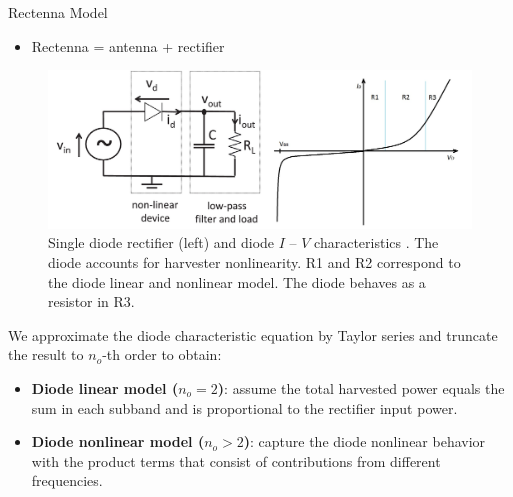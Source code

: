\documentclass[xcolor={table}]{beamer}
\begin{document}
\begin{frame}[fragile=singleslide,t]
\begin{columns}[onlytextwidth,T]
\begin{column}{.47\textwidth}
\begin{block}{Rectenna Model}
\begin{itemize}
  \item Rectenna = antenna + rectifier
\end{itemize}
\begin{figure}
  \centering
    \includegraphics[width=\textwidth]{rectenna_model}
  \caption{Single diode rectifier (left) and diode $I$ -- $V$ characteristics \citep{Clerckx2019}. The diode accounts for harvester nonlinearity. R1 and R2 correspond to the diode linear and nonlinear model. The diode behaves as a resistor in R3.}
  \label{fig:rectenna_model}
\end{figure}
We approximate the diode characteristic equation by Taylor series and truncate the result to ${n_o}$-th order to obtain:
  \begin{itemize}
    \item \textbf{Diode linear model (${n_o} = 2$)}: assume the total harvested power equals the sum in each subband and is proportional to the rectifier input power. %
    \item \textbf{Diode nonlinear model (${n_o} > 2$)}: capture the diode nonlinear behavior with the product terms that consist of contributions from different frequencies. %
  \end{itemize}
\end{block}



\end{column}
\end{columns}
\end{frame}
\end{document}
